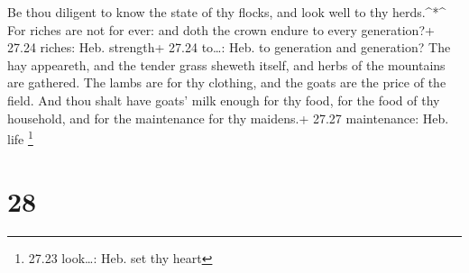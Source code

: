  Be thou diligent to know the state of thy flocks, and look
well to thy herds.\^{}*\^{}  For riches are not for ever:
and doth the crown endure to every generation?+ 27.24 riches: Heb.
strength+ 27.24 to\ldots: Heb. to generation and generation?
 The hay appeareth, and the tender grass sheweth itself,
and herbs of the mountains are gathered.  The lambs are for
thy clothing, and the goats are the price of the field. 
And thou shalt have goats' milk enough for thy food, for the food of thy
household, and for the maintenance for thy maidens.+ 27.27 maintenance:
Heb. life \footnote{27.23 look\ldots: Heb. set thy heart}

\hypertarget{section-27}{%
\section{28}\label{section-27}}

